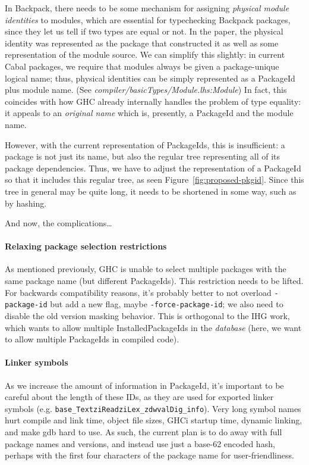 \documentclass{article}
\newcommand{\ghcfile}[1]{\textsl{#1}}
\begin{document}
In Backpack, there needs to be some mechanism for assigning
\emph{physical module identities} to modules, which are essential for
typechecking Backpack packages, since they let us tell if two types are
equal or not. In the paper, the physical identity was represented as the
package that constructed it as well as some representation of the module
source.  We can simplify this slightly: in current Cabal packages, we
require that modules always be given a package-unique logical name;
thus, physical identities can be simply represented as a PackageId plus
module name. (See \ghcfile{compiler/basicTypes/Module.lhs:Module})
In fact, this coincides with how GHC already internally handles
the problem of type equality: it appeals to an \emph{original name}
which is, presently, a PackageId and the module name.

However, with the current representation of PackageIds, this is
insufficient: a package is not just its name, but also the regular
tree representing all of its package dependencies.  Thus, we have
to adjust the representation of a PackageId so that it includes this
regular tree, as seen Figure~\ref{fig:proposed-pkgid}.  Since this
tree in general may be quite long, it needs to be shortened in some way,
such as by hashing.

And now, the complications\ldots

\paragraph{Relaxing package selection restrictions}  As mentioned
previously, GHC is unable to select multiple packages with the same
package name (but different PackageIds).  This restriction needs to be
lifted.  For backwards compatibility reasons, it's probably better to
not overload \verb|-package-id| but add a new flag, maybe \verb|-force-package-id|;
we also need to disable the old version masking behavior.  This is orthogonal
to the IHG work, which wants to allow multiple InstalledPackageIds in the
\emph{database} (here, we want to allow multiple PackageIds in compiled code).

\paragraph{Linker symbols} As we increase the amount of information in
PackageId, it's important to be careful about the length of these IDs,
as they are used for exported linker symbols (e.g.
\verb|base_TextziReadziLex_zdwvalDig_info|).  Very long symbol names
hurt compile and link time, object file sizes, GHCi startup time,
dynamic linking, and make gdb hard to use.  As such, the current plan is
to do away with full package names and versions, and instead use just a
base-62 encoded hash, perhaps with the first four characters of the package
name for user-friendliness.
\end{document}
